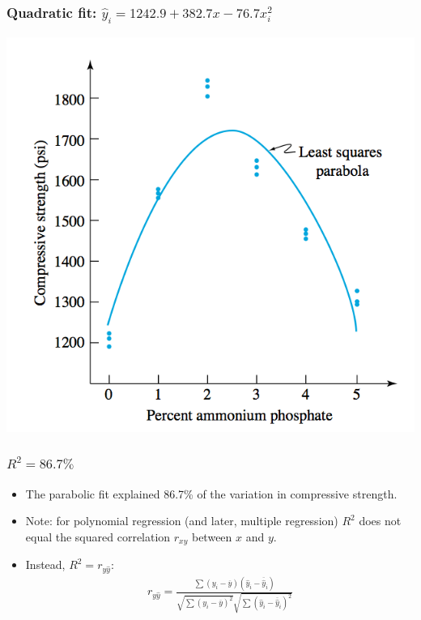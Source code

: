 \documentclass[handout]{beamer}\usepackage{graphicx, color}
\providecommand{\ov}[1]{\overline{#1}}
\providecommand{\wh}[1]{\widehat{#1}}
\numberwithin{equation}{section}
\begin{document}
\begin{frame}
\frametitle{Quadratic fit: $\wh{y}_i = 1242.9 + 382.7x - 76.7x_i^2$}
 \includegraphics{../../fig/flyashquadfitfit.png}
\end{frame}

\begin{frame}
\frametitle{$R^2 = 86.7\%$}
\begin{itemize}
\pause \item The parabolic fit explained 86.7\% of the variation in compressive strength. 
\pause \item Note: for polynomial regression (and later, multiple regression) $R^2$ does not equal the squared correlation $r_{xy}$ between $x$ and $y$. 
\pause \item Instead, $R^2 = r_{y \wh{y}}$: 
\pause \begin{align*}
 r_{y \wh{y}} = \frac{\sum(y_i - \ov{y})(\wh{y}_i - \ov{\wh{y}}_i)}{\sqrt{\sum (y_i - \ov{y})^2}\sqrt{\sum (\wh{y}_i - \ov{\wh{y}}_i)^2}}
\end{align*}
\end{itemize}
\end{frame}
\end{document}
